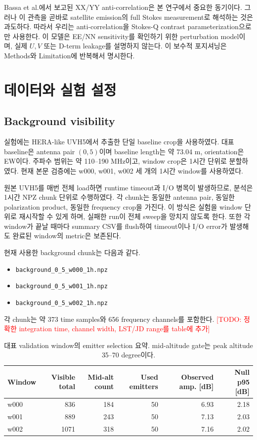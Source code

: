 \documentclass[11pt,a4paper]{article}
\newcommand{\todo}[1]{\textcolor{red}{[TODO: #1]}}
\begin{document}
Bassa et al.에서 보고된 XX/YY anti-correlation은 본 연구에서 중요한 동기이다.
그러나 이 관측을 곧바로 satellite emission의 full Stokes measurement로 해석하는 것은 과도하다.
따라서 우리는 anti-correlation을 Stokes-Q contrast parameterization으로만 사용한다.
이 모델은 EE/NN sensitivity를 확인하기 위한 perturbation model이며, 실제 $U,V$ 또는 D-term leakage를 설명하지 않는다.
이 보수적 포지셔닝은 Methods와 Limitation에 반복해서 명시한다.

\section{데이터와 실험 설정}

\subsection{Background visibility}

실험에는 HERA-like UVH5에서 추출한 단일 baseline crop을 사용하였다.
대표 baseline은 antenna pair $(0,5)$이며 baseline length는 약 73.04 m, orientation은 EW이다.
주파수 범위는 약 110--190 MHz이고, window crop은 1시간 단위로 분할하였다.
현재 본문 검증에는 w000, w001, w002 세 개의 1시간 window를 사용하였다.

원본 UVH5를 매번 전체 load하면 runtime timeout과 I/O 병목이 발생하므로, 분석은 1시간 NPZ chunk 단위로 수행하였다.
각 chunk는 동일한 antenna pair, 동일한 polarization product, 동일한 frequency crop을 가진다.
이 방식은 실험을 window 단위로 재시작할 수 있게 하며, 실패한 run이 전체 sweep을 망치지 않도록 한다.
또한 각 window가 끝날 때마다 summary CSV를 flush하여 timeout이나 I/O error가 발생해도 완료된 window의 metric은 보존된다.

현재 사용한 background chunk는 다음과 같다.

\begin{itemize}
  \item \texttt{background\_0\_5\_w000\_1h.npz}
  \item \texttt{background\_0\_5\_w001\_1h.npz}
  \item \texttt{background\_0\_5\_w002\_1h.npz}
\end{itemize}

각 chunk는 약 373 time samples와 656 frequency channels를 포함한다.
\todo{정확한 integration time, channel width, LST/JD range를 table에 추가}

\begin{table}[t]
\centering
\caption{대표 validation window의 emitter selection 요약. mid-altitude gate는 peak altitude 35--70 degree이다.}
\label{tab:window-summary}
\begin{tabular}{lrrrrr}
\toprule
Window & Visible total & Mid-alt count & Used emitters & Observed amp. [dB] & Null p95 [dB]\\
\midrule
w000 & 836  & 184 & 50 & 6.93 & 2.18\\
w001 & 889  & 243 & 50 & 7.13 & 2.03\\
w002 & 1071 & 318 & 50 & 7.16 & 2.02\\
\bottomrule
\end{tabular}
\end{table}
\end{document}
